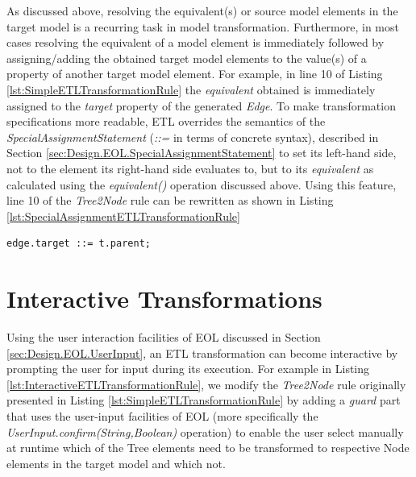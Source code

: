 As discussed above, resolving the equivalent(s) or source model elements in the target model is a recurring task in model transformation. Furthermore, in most cases resolving the equivalent of a model element is immediately followed by assigning/adding the obtained target model elements to the value(s) of a property of another target model element. For example, in line 10 of Listing \ref{lst:SimpleETLTransformationRule} the \emph{equivalent} obtained is immediately assigned to the \emph{target} property of the generated \emph{Edge}. To make transformation specifications more readable, ETL overrides the semantics of the \emph{SpecialAssignmentStatement} (\emph{::=} in terms of concrete syntax), described in Section \ref{sec:Design.EOL.SpecialAssignmentStatement} to set its left-hand side, not to the element its right-hand side evaluates to, but to its \emph{equivalent} as calculated using the \emph{equivalent()} operation discussed above. Using this feature, line 10 of the \emph{Tree2Node} rule can be rewritten as shown in Listing \ref{lst:SpecialAssignmentETLTransformationRule}

\begin{lstlisting}[basicstyle=\ttfamily\footnotesize, flexiblecolumns=true, numbers=none, nolol=true, caption=Rewritten Line 10 of the \emph{Tree2Node} Rule Demonstrated in Listing \ref{lst:SimpleETLTransformationRule}, label=lst:SpecialAssignmentETLTransformationRule, numbers=left, language=ETL, tabsize=2]
edge.target ::= t.parent;
\end{lstlisting}


\section{Interactive Transformations}
\label{sec:InteractiveModelTransformation}

Using the user interaction facilities of EOL discussed in Section \ref{sec:Design.EOL.UserInput}, an ETL transformation can become interactive by prompting the user for input during its execution. For example in Listing \ref{lst:InteractiveETLTransformationRule}, we modify the \emph{Tree2Node} rule originally presented in Listing \ref{lst:SimpleETLTransformationRule} by adding a \emph{guard} part that uses the user-input facilities of EOL (more specifically the \emph{UserInput.confirm(String,Boolean)} operation) to enable the user select manually at runtime which of the Tree elements need to be transformed to respective Node elements in the target model and which not. 

